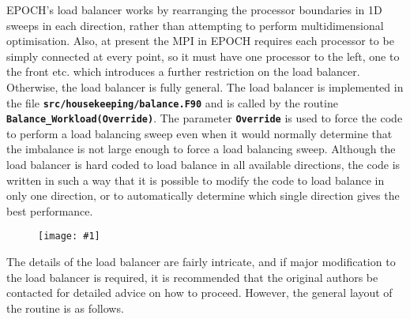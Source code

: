 \documentclass[12pt]{article}
\newcommand{\inlinecode}[1]{{\color{warwickred} \bf\texttt{#1}}}
\newcommand{\EPOCH}{{\color{warwickdark}\fontfamily{phv}\selectfont EPOCH} }
\newcommand{\image}[1]
  {{\begin{figure} \centering \texttt{[image: \#1]} \end{figure}}}
\begin{document}
EPOCH's load balancer works by rearranging the processor boundaries in 1D
sweeps in each direction, rather than attempting to perform multidimensional
optimisation. Also, at present the MPI in \EPOCH requires each processor to be
simply connected at every point, so it must have one processor to the left, one
to the front etc. which introduces a further restriction on the load
balancer. Otherwise, the load balancer is fully general. The load balancer is
implemented in the file \inlinecode{src/housekeeping/balance.F90} and is called
by the routine \inlinecode{Balance\_Workload(Override)}. The parameter
\inlinecode{Override} is used to force the code to perform a load balancing
sweep even when it would normally determine that the imbalance is not large
enough to force a load balancing sweep. Although the load balancer is hard
coded to load balance in all available directions, the code is written in such
a way that it is possible to modify the code to load balance in only one
direction, or to automatically determine which single direction gives the best
performance.

\image{./images/sweep.eps}

The details of the load balancer are fairly intricate, and if major
modification to the load balancer is required, it is recommended that the
original authors be contacted for detailed advice on how to proceed. However,
the general layout of the routine is as follows.
\end{document}
